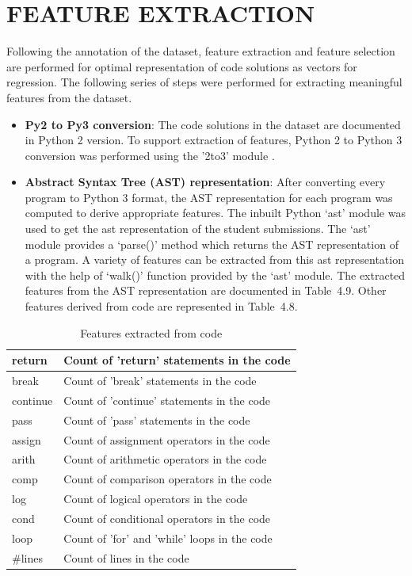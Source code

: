 \newpage

\section{FEATURE EXTRACTION}

Following the annotation of the dataset, feature extraction
and feature selection are performed for optimal
representation of code solutions as vectors for
regression. The following series of steps were performed for
extracting meaningful features from the dataset.

\begin{itemize}
\item \textbf{Py2 to Py3 conversion}: The code solutions in
  the dataset are documented in Python 2 version. To support
  extraction of features, Python 2 to Python 3 conversion was
  performed using the '2to3' module \cite{G}.
\item \textbf{Abstract Syntax Tree (AST) representation}:
  After converting every program to Python 3 format, the AST
  \cite{F} representation for each program was computed to
  derive appropriate features. The inbuilt Python `ast'
  module was used to get the ast representation of the
  student submissions. The `ast' module provides a `parse()'
  method which returns the AST representation of a program. A
  variety of features can be extracted from this ast
  representation with the help of `walk()' function provided
  by the `ast' module. The extracted features from the AST
  representation are documented in Table~4.9. Other features
  derived from code are represented in Table~4.8.
\end{itemize}

\begin{table}[H]
\centering
\caption{Features extracted from code}
\begin{tabular}{|l|l|} 
\hline
return       & Count of 'return' statements in the code      \\ 
\hline
break        & Count of 'break' statements in the code       \\ 
\hline
continue     & Count of 'continue' statements in the code    \\ 
\hline
pass         & Count of 'pass' statements in the code        \\ 
\hline
assign       & Count of assignment operators in the code     \\ 
\hline
arith        & Count of arithmetic operators in the code     \\ 
\hline
comp         & Count of comparison operators in the code     \\ 
\hline
log          & Count of logical operators in the code        \\ 
\hline
cond         & Count of conditional operators in the code    \\ 
\hline
loop         & Count of 'for' and 'while' loops in the code  \\ 
\hline
\#lines      & Count of lines in the code                    \\ 
\hline
\end{tabular}
\end{table}

